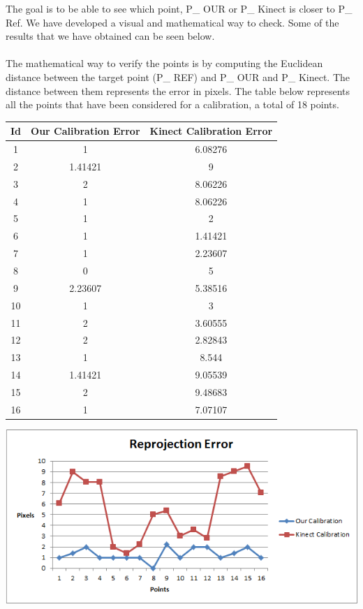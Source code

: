 \noindent
The goal is to be able to see which point, P\_ OUR or P\_ Kinect is closer to P\_ Ref. We have developed a visual and mathematical way to check. Some of the results that we have obtained can be seen below. 
\\\\
The mathematical way to verify the points is by computing the Euclidean distance between the target point (P\_ REF) and P\_ OUR and P\_ Kinect. The distance between them represents the error in pixels. The table below represents all the points that have been considered for a calibration, a total of 18 points. 

\begin{center}
  \begin{tabular}{| c | c | c |}
    \hline
    Id & Our Calibration Error & Kinect Calibration Error \\ \hline
    1 & 1 & 6.08276 \\ \hline
	2 & 1.41421 & 9 \\ \hline
	3 & 2 & 8.06226 \\ \hline
	4 & 1 & 8.06226 \\ \hline
	5 & 1 & 2 \\ \hline
	6 & 1 & 1.41421 \\ \hline
	7 & 1 & 2.23607 \\ \hline
	8 & 0 & 5 \\ \hline
	9 & 2.23607 & 5.38516 \\ \hline
	10 & 1 & 3 \\ \hline
	11 & 2 & 3.60555 \\ \hline
	12 & 2 & 2.82843 \\ \hline
	13 & 1 & 8.544 \\ \hline
	14 & 1.41421 & 9.05539 \\ \hline
	15 & 2 & 9.48683 \\ \hline
	16 & 1 & 7.07107 \\ \hline
  \end{tabular}
\end{center}

\begin{center}
	\includegraphics[scale=1]{images/chart.png}
\end{center}

